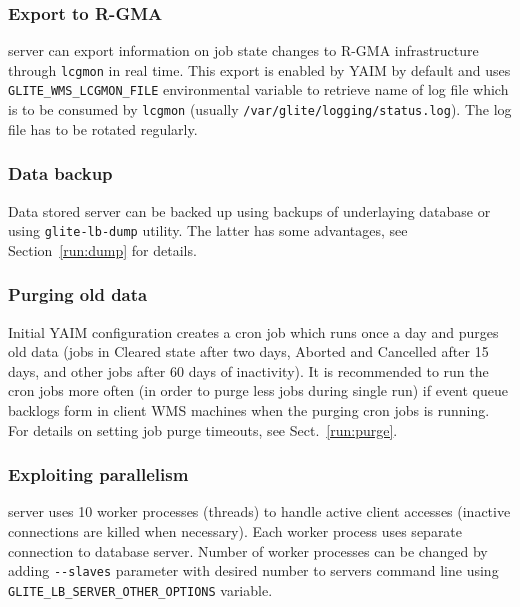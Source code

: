 \subsubsection{Export to R-GMA}

{\sloppy
\LB server can export information on job state changes to R-GMA infrastructure through \verb'lcgmon' 
in real time. This export is enabled by YAIM by default and uses \verb'GLITE_WMS_LCGMON_FILE' 
environmental variable to retrieve name of log file which is to be consumed by \verb'lcgmon' (usually
\verb'/var/glite/logging/status.log'). The log file has to be rotated regularly.

}

\subsubsection{Data backup}
\label{inst:backup}

Data stored \LB server can be backed up using backups of underlaying database or using \verb'glite-lb-dump' utility.
The latter has some advantages, see Section~\ref{run:dump} for details.

\subsubsection{Purging old data}
\label{inst:purge}

Initial YAIM configuration creates a cron job which runs once a day and purges old 
data (jobs in Cleared state after two days, Aborted and Cancelled after 15 days, and other jobs 
after 60 days of inactivity). It is recommended to run the cron jobs more often (in order to purge less jobs
during single run) if event queue backlogs form in client WMS machines when the purging cron jobs is running.
For details on setting job purge timeouts, see Sect.~\ref{run:purge}.


\subsubsection{Exploiting parallelism}

\LB server uses 10 worker processes (threads) to handle active client accesses (inactive connections are killed
when necessary). Each worker process uses separate connection to database server. Number of worker processes 
can be changed by adding \verb'--slaves' parameter with desired number to servers command line
using \verb'GLITE_LB_SERVER_OTHER_OPTIONS' variable.

